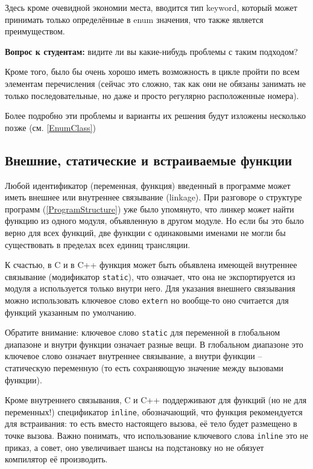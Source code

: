 \documentclass[a4paper,12pt,oneside]{book}
\newif\ifanswers
\begin{document}
Здесь кроме очевидной экономии места, вводится тип keyword, который может принимать только определённые в enum значения, что также является преимуществом.

\textbf{Вопрос к студентам:} видите ли вы какие-нибудь проблемы с таким подходом?

\ifanswers
Возможный ответ: да, символьное имя \lstinline!TOKEN! может конфликтовать с другим перечислением.
\fi

Кроме того, было бы очень хорошо иметь возможность в цикле пройти по всем элементам перечисления (сейчас это сложно, так как они не обязаны занимать не только последовательные, но даже и просто регулярно расположенные номера).

Более подробно эти проблемы и варианты их решения будут изложены несколько позже (см. \ref{EnumClass})

\subsection{Внешние, статические и встраиваемые функции}\label{Inline}

Любой идентификатор (переменная, функция) введенный в программе может иметь внешнее или внутреннее связывание (linkage). При разговоре о структуре программ (\ref{ProgramStructure}) уже было упомянуто, что линкер может найти функцию из одного модуля, объявленную в другом модуле. Но если бы это было верно для всех функций, две функции с одинаковыми именами не могли бы существовать в пределах всех единиц трансляции. 

К счастью, в C и в C++ функция может быть объявлена имеющей внутреннее связывание (модификатор \lstinline!static!), что означает, что она не экспортируется из модуля а используется только внутри него. Для указания внешнего связывания можно использовать ключевое слово \lstinline!extern! но вообще-то оно считается для функций указанным по умолчанию.

Обратите внимание: ключевое слово \lstinline!static! для переменной в глобальном диапазоне и внутри функции означает разные вещи. В глобальном диапазоне это ключевое слово означает внутреннее связывание, а внутри функции -- статическую переменную (то есть сохраняющую значение между вызовами функции).

Кроме внутреннего связывания, C и C++ поддерживают для функций (но не для переменных!) спецификатор \lstinline!inline!, обозначающий, что функция рекомендуется для встраивания: то есть вместо настоящего вызова, её тело будет размещено в точке вызова. Важно понимать, что использование ключевого слова \lstinline!inline! это не приказ, а совет, оно увеличивает шансы на подстановку но не обязует компилятор её производить.
\end{document}

